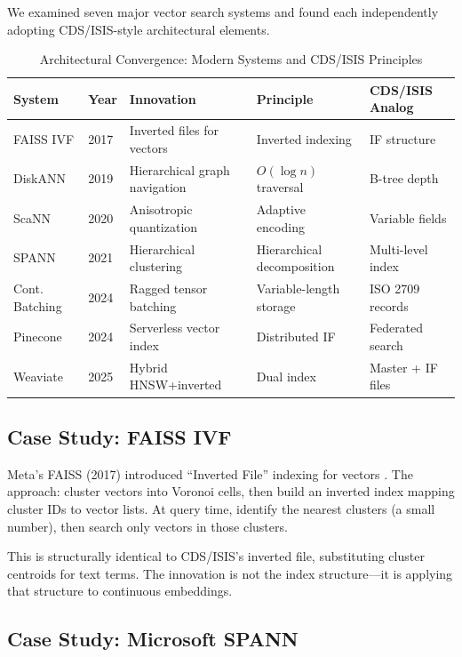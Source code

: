\documentclass[manuscript,screen,nonacm]{acmart}
\begin{document}
We examined seven major vector search systems and found each independently adopting CDS/ISIS-style architectural elements.

\begin{table}[h]
\centering
\caption{Architectural Convergence: Modern Systems and CDS/ISIS Principles}
\label{tab:convergence}
\begin{tabular}{p{} p{} p{} p{} p{}}
\toprule
\textbf{System} & \textbf{Year} & \textbf{Innovation} & \textbf{Principle} & \textbf{CDS/ISIS Analog} \\
\midrule
FAISS IVF & 2017 & Inverted files for vectors & Inverted indexing & IF structure \\
DiskANN & 2019 & Hierarchical graph navigation & $O(\log n)$ traversal & B-tree depth \\
ScaNN & 2020 & Anisotropic quantization & Adaptive encoding & Variable fields \\
SPANN & 2021 & Hierarchical clustering & Hierarchical decomposition & Multi-level index \\
Cont. Batching & 2024 & Ragged tensor batching & Variable-length storage & ISO 2709 records \\
Pinecone & 2024 & Serverless vector index & Distributed IF & Federated search \\
Weaviate & 2025 & Hybrid HNSW+inverted & Dual index & Master + IF files \\
\bottomrule
\end{tabular}
\end{table}

\subsection{Case Study: FAISS IVF}

Meta's FAISS (2017) introduced ``Inverted File'' indexing for vectors \cite{johnson2017}. The approach: cluster vectors into Voronoi cells, then build an inverted index mapping cluster IDs to vector lists. At query time, identify the nearest clusters (a small number), then search only vectors in those clusters.

This is structurally identical to CDS/ISIS's inverted file, substituting cluster centroids for text terms. The innovation is not the index structure---it is applying that structure to continuous embeddings.

\subsection{Case Study: Microsoft SPANN}
\end{document}
